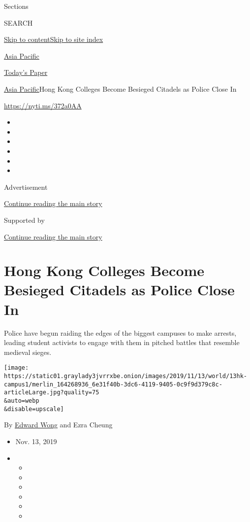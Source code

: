 Sections

SEARCH

\protect\hyperlink{site-content}{Skip to
content}\protect\hyperlink{site-index}{Skip to site index}

\href{https://www.nytimes3xbfgragh.onion/section/world/asia}{Asia
Pacific}

\href{https://myaccount.nytimes3xbfgragh.onion/auth/login?response_type=cookie\&client_id=vi}{}

\href{https://www.nytimes3xbfgragh.onion/section/todayspaper}{Today's
Paper}

\href{/section/world/asia}{Asia Pacific}\textbar{}Hong Kong Colleges
Become Besieged Citadels as Police Close In

\url{https://nyti.ms/372a0AA}

\begin{itemize}
\item
\item
\item
\item
\item
\item
\end{itemize}

Advertisement

\protect\hyperlink{after-top}{Continue reading the main story}

Supported by

\protect\hyperlink{after-sponsor}{Continue reading the main story}

\hypertarget{hong-kong-colleges-become-besieged-citadels-as-police-close-in}{%
\section{Hong Kong Colleges Become Besieged Citadels as Police Close
In}\label{hong-kong-colleges-become-besieged-citadels-as-police-close-in}}

Police have begun raiding the edges of the biggest campuses to make
arrests, leading student activists to engage with them in pitched
battles that resemble medieval sieges.

\texttt{[image: https://static01.graylady3jvrrxbe.onion/images/2019/11/13/world/13hk-campus1/merlin\_164268936\_6e31f40b-3dc6-4119-9405-0c9f9d379c8c-articleLarge.jpg?quality=75\\\&auto=webp\\\&disable=upscale]}

By \href{https://www.nytimes3xbfgragh.onion/by/edward-wong}{Edward Wong}
and Ezra Cheung

\begin{itemize}
\item
  Nov. 13, 2019
\item
  \begin{itemize}
  \item
  \item
  \item
  \item
  \item
  \item
  \end{itemize}
\end{itemize}

